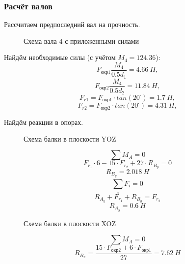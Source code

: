 \documentclass[14pt,a4paper,russian]{scrartcl}
\begin{document}
    \subsubsection{Расчёт валов}
        Рассчитаем предпоследний вал на прочность. 
        \begin{figure}[h]
            \caption{Схема вала 4 с приложенными силами}
        \end{figure}
        Найдём необходимые силы (с учётом \( M_4 = 124.36 \)):
        \[ F_{\text{окр1}} \frac{M_4}{0.5d_1} = 4.66\ H,\]
        \[ F_{\text{окр2}} \frac{M_4}{0.5d_2} = 11.84\ H,\]
        \[ F_{r1} = F_{\text{окр1}}\cdot tan(20^\cdot) = 1.7\ H,\]
        \[ F_{r2} = F_{\text{окр2}}\cdot tan(20^\cdot) = 4.31\ H,\]

        Найдём реакции в опорах.\par
        \begin{figure}[h]
            \caption{Схема балки в плоскости YOZ}
        \end{figure}
        \[ \sum M_A = 0 \]
        \[ F_{r_1}\cdot 6 - 15\cdot F_{r_2} + 27\cdot R_{B_y} = 0\]
        \[ R_{B_y} = 2.018\ H\]
        \[ \sum_{i}^{}F_i = 0 \]
        \[ R_{A_y} + F_{r_1} + R_{B_y} = F_{r_2} \]
        \[ R_{A_y} = 0.6\ H\]        
        
        \begin{figure}[h]
            \caption{Схема балки в плоскости XOZ}
        \end{figure}
        \[ \sum M_A = 0 \]
        \[ R_{B_x} = \frac{15\cdot F_{\text{окр2}} + 6\cdot F_{\text{окр1}}}{27} = 7.62\ H\]
        
\end{document}
